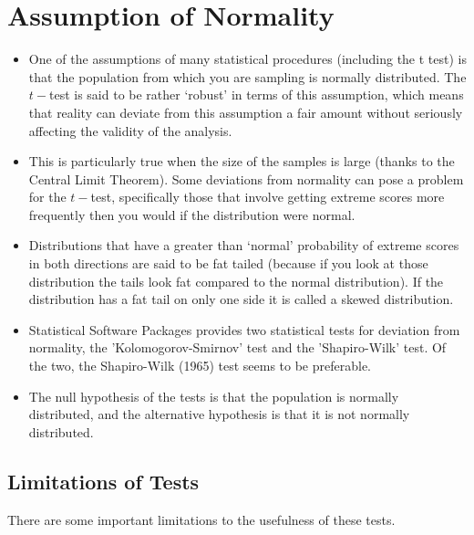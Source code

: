 \section{Assumption of Normality}
\begin{itemize}
	\item One of the assumptions of many statistical procedures (including the t test) is that the population from which you are sampling is normally distributed. The $t-$test is said to be rather ‘robust’ in terms of this assumption, which means that reality can deviate from this assumption a fair amount without seriously affecting the validity of the analysis. 
	
	\item This is particularly true when the size of the samples is large (thanks to the Central Limit Theorem). Some deviations from normality can pose a problem for the $t-$test, specifically those that involve getting extreme scores more frequently then you would if the distribution were normal. 
	
	\item Distributions that have a greater than ‘normal’ probability of extreme scores in both directions are said to be fat tailed (because if you look at those distribution the tails look fat compared to the normal distribution). If the distribution has a fat tail on only one side it is called a skewed distribution. 
	
	\item Statistical Software Packages provides two statistical tests for deviation from normality, the 'Kolomogorov-Smirnov' test and the 'Shapiro-Wilk' test. Of the two, the Shapiro-Wilk (1965) test seems to be preferable.
	
	\item The null hypothesis of the tests is that the population is normally distributed, and the alternative hypothesis is that it is not normally distributed. 
\end{itemize}

	

\subsection{Limitations of Tests}
There are some important limitations to the usefulness of these tests.

